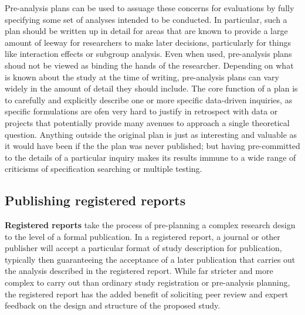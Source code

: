 Pre-analysis plans can be used to assuage these concerns for evaluations
by fully specifying some set of analyses intended to be conducted.
In particular, such a plan should be written up in detail
for areas that are known to provide a large amount of leeway
for researchers to make later decisions,
particularly for things like interaction effects or subgroup analysis.
Even when used, pre-analysis plans shoud not be viewed as binding the hands of the researcher.\cite{olken2015promises}
Depending on what is known about the study at the time of writing,
pre-analysis plans can vary widely in the amount of detail they should include.
The core function of a plan is to carefully and explicitly describe
one or more specific data-driven inquiries,
as specific formulations are ofen very hard to justify in retrospect
with data or projects that potentially provide many avenues to approach
a single theoretical question.
Anything outside the original plan is just as interesting and valuable
as it would have been if the the plan was never published;
but having pre-committed to the details of a particular inquiry makes its results
immune to a wide range of criticisms of specification searching or multiple testing.\cite{duflo2020praise}


\subsection{Publishing registered reports}

\textbf{Registered reports}
take the process of pre-planning a complex research design
to the level of a formal publication.
In a registered report, a journal or other publisher
will accept a particular format of study description for publication,
typically then guaranteeing the acceptance of a later publication
that carries out the analysis described in the registered report.
While far stricter and more complex to carry out than
ordinary study registration or pre-analysis planning,
the registered report has the added benefit
of soliciting peer review and expert feedback
on the design and structure of the proposed study.


